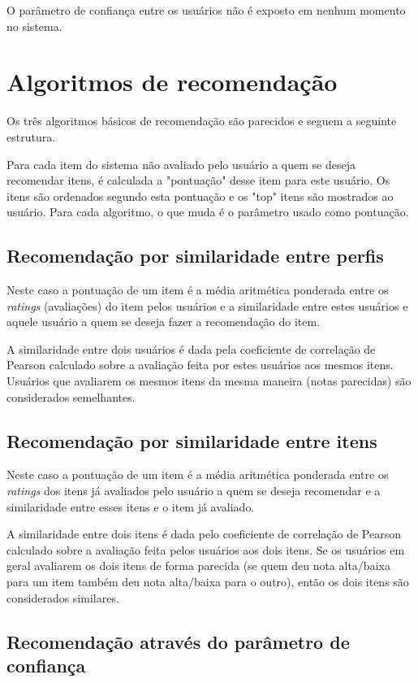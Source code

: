 \documentclass[a4paper,12pt]{article}
\begin{document}
O parâmetro de confiança entre os usuários não é exposto em nenhum momento no sistema.

\section{Algoritmos de recomendação}
\label{algoritmos}

Os três algoritmos básicos de recomendação são parecidos e seguem a seguinte estrutura.

Para cada item do sistema não avaliado pelo usuário a quem se deseja recomendar itens, é calculada a "pontuação" desse item para este usuário. Os itens são ordenados segundo esta pontuação e os "top" itens são mostrados ao usuário. Para cada algoritmo, o que muda é o parâmetro usado como pontuação.

\subsection{Recomendação por similaridade entre perfis}

Neste caso a pontuação de um item é a média aritmética ponderada entre os \textit{ratings} (avaliações) do item pelos usuários e a similaridade entre estes usuários e aquele usuário a quem se deseja fazer a recomendação do item.

A similaridade entre dois usuários é dada pela coeficiente de correlação de Pearson calculado sobre a avaliação feita por estes usuários aos mesmos itens. Usuários que avaliarem os mesmos itens da mesma maneira (notas parecidas) são considerados semelhantes.

\subsection{Recomendação por similaridade entre itens}

Neste caso a pontuação de um item é a média aritmética ponderada entre os \textit{ratings} dos itens já avaliados pelo usuário a quem se deseja recomendar e a similaridade entre esses itens e o item já avaliado.

A similaridade entre dois itens é dada pelo coeficiente de correlação de Pearson calculado sobre a avaliação feita pelos usuários aos dois itens. Se os usuários em geral avaliarem os dois itens de forma parecida (se quem deu nota alta/baixa para um item também deu nota alta/baixa para o outro), então os dois itens são considerados similares.

\subsection{Recomendação através do parâmetro de confiança}
\end{document}
